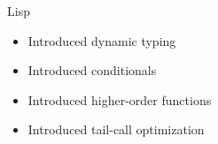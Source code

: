 \documentclass[pdf]{beamer}
\begin{document}
\begin{frame}{Lisp}
  \begin{figure}[H]
    \centering
    \hspace{0.1cm}
  \end{figure}
    \centering
    \begin{itemize}
    \item Introduced dynamic typing
    \item Introduced conditionals
    \item Introduced higher-order functions
    \item Introduced tail-call optimization
    \end{itemize}
\end{frame}
\end{document}
